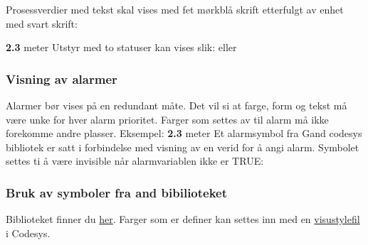 Prosessverdier med tekst skal vises med fet mørkblå skrift etterfulgt av enhet med svart skrift:

\vskip 5pt 

\textbf{\textcolor[HTML]{0000D7}{2.3}} meter
\vskip 1cm 
Utstyr med to statuser kan vises slik:
\vskip 5pt 
eller
\subsubsection{Visning av alarmer}
Alarmer bør vises på en redundant måte. Det vil si at farge, form og tekst må være unke for hver alarm prioritet. 
Farger som settes av til alarm må ikke forekomme andre plasser. 
\vskip 5pt 
Eksempel:
\vskip 5pt 
 \textbf{\textcolor[HTML]{0000D7}{2.3}} meter
\vskip 5pt 
Et alarmsymbol fra Gand codesys bibliotek er satt i forbindelse med visning av en verid for å angi alarm. Symbolet settes ti å være invisible når alarmvariablen ikke er TRUE:
\subsubsection{Bruk av symboler fra and bibilioteket}
Biblioteket finner du \href{https://rfka-my.sharepoint.com/:u:/g/personal/fred-olav_mosdal_skole_rogfk_no/EZycS5I7-ZdGjaCqIlRDeAoB0iXKpeeXCMJg4WflkLV-Sg?e=Hi4A6N}{her}. Farger som er definer kan settes inn med en \href{https://rfka-my.sharepoint.com/:u:/g/personal/fred-olav_mosdal_skole_rogfk_no/EfmBwSFs6PZCh73dTYgoGZMBGHH9Ros14TSsgv9RhuAsAA?e=EnMdNi}{visustylefil} i Codesys. 

